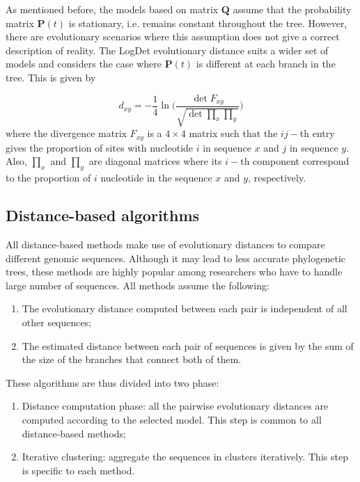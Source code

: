 As mentioned before, the models based on matrix $\mathbf{Q}$ assume that the probability matrix $\mathbf{P}(t)$ is stationary, i.e. remains constant throughout the tree. However, there are evolutionary scenarios where this assumption does not give a correct description of reality. The LogDet evolutionary distance \cite{L94} suits a wider set of models and considers the case where $\mathbf{P}(t)$ is different at each branch in the tree. This is given by

\begin{equation}
    d_{xy} = -\frac{1}{4}\ln\Bigg( \frac{\det F_{xy}}{\sqrt{\det \prod_x \prod_y}} \Bigg)
\label{eq:LogDet_distance}
\end{equation}
where the divergence matrix $F_{xy}$ is a $4\times 4$ matrix such that the $ij-$th entry gives the proportion of sites with nucleotide $i$ in sequence $x$ and $j$ in sequence $y$. Also, $\prod_x$ and $\prod_y$ are diagonal matrices where its $i-$th component correspond to the proportion of $i$ nucleotide in the sequence $x$ and $y$, respectively.

\subsection{Distance-based algorithms}

All distance-based methods make use of evolutionary distances to compare different genomic sequences. Although it may lead to less accurate phylogenetic trees, these methods are highly popular among researchers who have to handle large number of sequences. All methods assume the following:

\begin{enumerate}
    \item The evolutionary distance computed between each pair is independent of all other sequences;
    \item The estimated distance between each pair of sequences is given by the sum of the size of the branches that connect both of them.
\end{enumerate}

These algorithms are thus divided into two phase: 

\begin{enumerate}
    \item Distance computation phase: all the pairwise evolutionary distances are computed according to the selected model. This step is common to all distance-based methods;
    \item Iterative clustering: aggregate the sequences in clusters iteratively. This step is specific to each method.
\end{enumerate}

